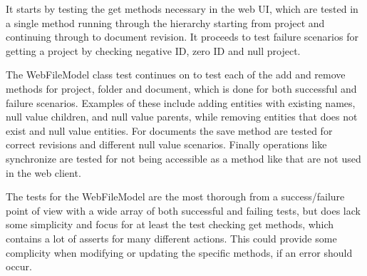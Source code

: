 It starts by testing the get methods necessary in the web UI, which are tested in a single method running through the hierarchy starting from project and continuing through to document revision. It proceeds to test failure scenarios for getting a project by checking negative ID, zero ID and null project.

The WebFileModel class test continues on to test each of the add and remove methods for project, folder and document, which is done for both successful and failure scenarios. Examples of these include adding entities with existing names, null value children, and null value parents, while removing entities that does not exist and null value entities. For documents the save method are tested for correct revisions and different null value scenarios. Finally operations like synchronize are tested for not being accessible as a method like that are not used in the web client.

The tests for the WebFileModel are the most thorough from a success/failure point of view with a wide array of both successful and failing tests, but does lack some simplicity and focus for at least the test checking get methods, which contains a lot of asserts for many different actions. This could provide some complicity when modifying or updating the specific methods, if an error should occur.
